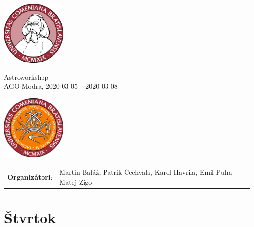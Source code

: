\documentclass[a4paper]{report}
\begin{document}
    \begin{minipage}{\textwidth}
        \begin{minipage}{0.2\textwidth}
            \includegraphics[width=32mm]{input/logo.jpg}
        \end{minipage}
        \begin{minipage}{0.58\textwidth}
            \centering
            \fontsize{40}{50}\selectfont
            Astroworkshop\\
            \Large
            AGO Modra, 2020-03-05 -- 2020-03-08
        \end{minipage}
        \begin{minipage}{0.2\textwidth}
            \includegraphics[width=32mm]{input/fmfi.png}
        \end{minipage}
    \end{minipage}
    \vspace*{10mm}

    \begin{tabularx}{\textwidth}{>{}p{2cm} >{\RaggedRight}X}
        \textbf{Organizátori}: &
            Martin Baláž,             Patrik Čechvala,             Karol Havrila,             Emil Puha,             Matej Zigo             \\
    \end{tabularx}

            \section{Štvrtok}
\end{document}
